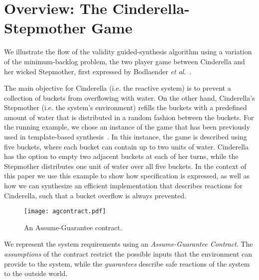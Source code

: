 \section{Overview: The Cinderella-Stepmother Game}
\label{sec:example}

We illustrate the flow of the validity guided-synthesis algorithm using a variation of the minimum-backlog
problem, the two player game between Cinderella and her wicked Stepmother, first expressed by Bodlaender \textit{et al.}~\cite{bodlaender2012cinderella}.

The main objective for Cinderella (i.e. the reactive system) is to prevent a
collection of buckets from overflowing with water. On the other hand,
Cinderella's Stepmother (i.e. the system's environment) refills the buckets with a predefined amount of water that is distributed in a random fashion between the buckets.
For the running example, we chose an instance of the game that has been
previously used in template-based synthesis~\cite{beyene2014constraint}. In this instance, the game is described
using five buckets, where each bucket can contain up to two units of water.
Cinderella has the option to empty two adjacent buckets at each of her turns,
while the Stepmother distributes one unit of water over all five buckets. In the context of this paper we use this example to show how specification is expressed, as well as how we can synthesize an efficient implementation that describes reactions for Cinderella, such that a bucket overflow is always prevented.

\begin{figure}[!t]
\centering
\texttt{[image: agcontract.pdf]}
\caption{An Assume-Guarantee contract.}
\label{fg:agcontract}
\end{figure}

We represent the system requirements using an \textit{Assume-Guarantee
Contract}. The \emph{assumptions} of the contract restrict the possible inputs that the
environment can provide to the system, while the \emph{guarantees}
describe safe reactions of the system to the outside world.

